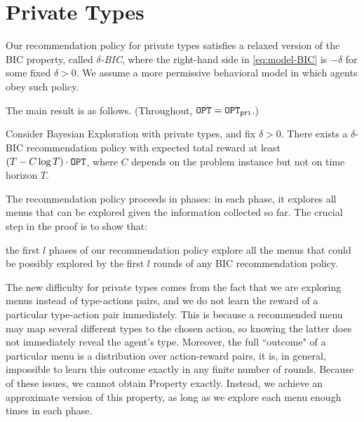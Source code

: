 
\section{Private Types}
\label{sec:private_nc}

Our recommendation policy for private types satisfies a relaxed version of the BIC property, called \emph{$\delta$-BIC}, where the right-hand side in \eqref{eq:model-BIC} is $-\delta$ for some fixed $\delta>0$. We assume a more permissive behavioral model in which agents obey such policy.

The main result is as follows. (Throughout, $\mathtt{OPT} = \mathtt{OPT}_{\mathtt{pri}}$.)


\begin{theorem}
\label{thm:private_nocc}
Consider Bayesian Exploration with private types, and fix $\delta > 0$. There exists a $\delta$-BIC recommendation policy with expected total reward at least $\left(T - C \log T \right) \cdot \mathtt{OPT}$, where $C$ depends on the problem instance but not on time horizon $T$.
\end{theorem}

The recommendation policy proceeds in phases: in each phase, it explores all menus that can be explored given the information collected so far. The crucial step in the proof is to show that:

\begin{property}
\item the first $l$ phases of our recommendation policy explore all the menus that could be possibly explored by the first $l$ rounds of any BIC recommendation policy.
    \label{prop:private-exploration}
\end{property}

The new difficulty for private types comes from the fact that we are exploring menus instead of type-actions pairs, and we do not learn the reward of a particular type-action pair immediately. This is because a recommended menu may map several different types to the chosen action, so knowing the latter does not immediately reveal the agent's type. Moreover, the full ``outcome" of a particular menu is a distribution over action-reward pairs, it is, in general, impossible to learn this outcome exactly in any finite number of rounds.  Because of these issues, we cannot obtain Property  exactly. Instead, we achieve an approximate version of this property, as long as we explore each menu enough times in each phase.

